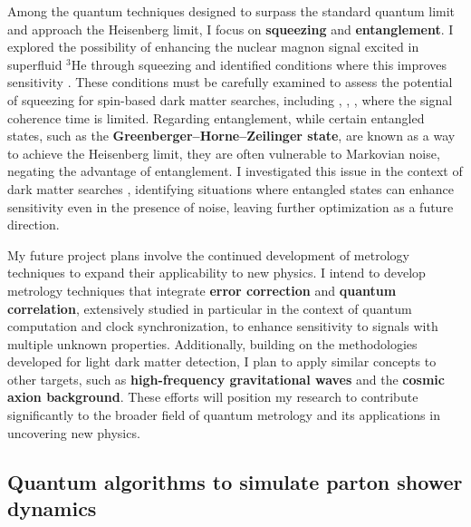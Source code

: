 \documentclass[12pt]{article}
\begin{document}
Among the quantum techniques designed to surpass the standard quantum limit and approach the Heisenberg limit, I focus on \textbf{squeezing} and \textbf{entanglement}.
I explored the possibility of enhancing the nuclear magnon signal excited in superfluid $\mathrm{^3He}$ through squeezing and identified conditions where this improves sensitivity \cite{Chigusa:2023szl}.
These conditions must be carefully examined to assess the potential of squeezing for spin-based dark matter searches, including \cite{Chigusa:2020gfs}, \cite{Chigusa:2021mci}, \cite{Chigusa:2023hmz}, where the signal coherence time is limited.
Regarding entanglement, while certain entangled states, such as the \textbf{Greenberger–Horne–Zeilinger state}, are known as a way to achieve the Heisenberg limit, they are often vulnerable to Markovian noise, negating the advantage of entanglement.
I investigated this issue in the context of dark matter searches \cite{Sichanugrist:2024wfk}, identifying situations where entangled states can enhance sensitivity even in the presence of noise, leaving further optimization as a future direction.

My future project plans involve the continued development of metrology techniques to expand their applicability to new physics.
I intend to develop metrology techniques that integrate \textbf{error correction} and \textbf{quantum correlation}, extensively studied in particular in the context of quantum computation and clock synchronization, to enhance sensitivity to signals with multiple unknown properties.
Additionally, building on the methodologies developed for light dark matter detection, I plan to apply similar concepts to other targets, such as \textbf{high-frequency gravitational waves} and the \textbf{cosmic axion background}.
These efforts will position my research to contribute significantly to the broader field of quantum metrology and its applications in uncovering new physics.

\subsection*{Quantum algorithms to simulate parton shower dynamics}
\end{document}
